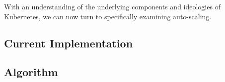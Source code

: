 With an understanding of the underlying components and ideologies of Kubernetes,
we can now turn to specifically examining auto-scaling.

\subsection{Current Implementation}



\subsection{Algorithm}


